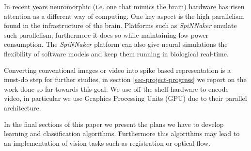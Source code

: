 In recent years neuromorphic (i.e. one that mimics the brain) hardware has
risen attention as a different way of computing. One key aspect is the high
parallelism found in the infrastructure of the brain. Platforms such as
\emph{SpiNNaker} \cite{spinnaker-review} emulate such parallelism; furthermore
it does so while maintaining low power consumption. The \emph{SpiNNaker}
platform can also give neural simulations the flexibility of software models
and keep them running in biological real-time.

Converting conventional images or video into spike based representation is a
must-do step for further studies, in section \ref{sec-project-progress} we
report on the work done so far towards this goal. We use off-the-shelf hardware
to encode video, in particular we use Graphics Processing Units (GPU) due to 
their parallel architecture. 

In the final sections of this paper we present the plans we have to develop 
learning and classification algorithms. Furthermore this algorithms may lead to 
an implementation of vision tasks such as registration or optical flow.

